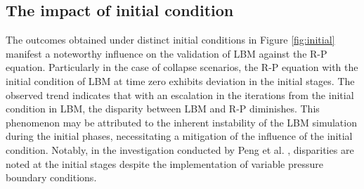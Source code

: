 \documentclass[review]{elsarticle}
\begin{document}
\subsection{The impact of initial condition}
The outcomes obtained under distinct initial conditions in Figure \ref{fig:initial} manifest a noteworthy influence on the validation of LBM against the R-P equation. Particularly in the case of collapse scenarios, the R-P equation with the initial condition of LBM at time zero exhibits deviation in the initial stages. The observed trend indicates that with an escalation in the iterations from the initial condition in LBM, the disparity between LBM and R-P diminishes. This phenomenon may be attributed to the inherent instability of the LBM simulation during the initial phases, necessitating a mitigation of the influence of the initial condition. Notably, in the investigation conducted by Peng et al. \cite{peng2019simulation}, disparities are noted at the initial stages despite the implementation of variable pressure boundary conditions. 
\end{document}
